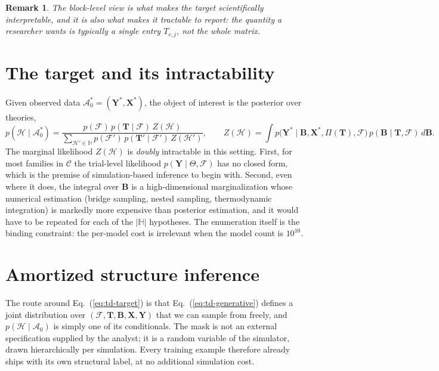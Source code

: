 \documentclass[11pt]{article}
\newcommand{\rmB}{\mathbf{B}}
\newcommand{\rmX}{\mathbf{X}}
\newcommand{\rmY}{\mathbf{Y}}
\newcommand{\rmT}{\mathbf{T}}
\providecommand{\cref}[1]{Eq.~(\ref{#1})}
\newtheorem{remark}{Remark}
\begin{document}
\begin{remark}
The block-level view is what makes the target scientifically interpretable, and it is
also what makes it tractable to report: the quantity a researcher wants is typically a
single entry $T_{c,j}$, not the whole matrix.
\end{remark}

\section{The target and its intractability}

Given observed data $\mathcal{A}_0^\ast = (\rmY^\ast, \rmX^\ast)$, the object of interest is
the posterior over theories,
%
\begin{equation}
\label{eq:td-target}
p(\mathcal{H} \mid \mathcal{A}_0^\ast)
= \frac{p(\mathcal{F})\,p(\rmT \mid \mathcal{F})\, Z(\mathcal{H})}
       {\sum_{\mathcal{H}' \in \mathbb{H}} p(\mathcal{F}')\,p(\rmT' \mid \mathcal{F}')\, Z(\mathcal{H}')},
\qquad
Z(\mathcal{H}) = \!\int\! p\big(\rmY^\ast \mid \rmB, \rmX^\ast, \Pi(\rmT), \mathcal{F}\big)\,
p(\rmB \mid \rmT, \mathcal{F})\, d\rmB .
\end{equation}
%
The marginal likelihood $Z(\mathcal{H})$ is \emph{doubly} intractable in this setting.
First, for most families in $\mathcal{C}$ the trial-level likelihood
$p(\rmY \mid \Theta, \mathcal{F})$ has no closed form, which is the premise of
simulation-based inference to begin with. Second, even where it does, the integral over
$\rmB$ is a high-dimensional marginalization whose numerical estimation (bridge
sampling, nested sampling, thermodynamic integration) is markedly more expensive than
posterior estimation, and it would have to be repeated for each of the $|\mathbb{H}|$
hypotheses. The enumeration itself is the binding constraint: the per-model cost is
irrelevant when the model count is $10^{10}$.

\section{Amortized structure inference}

The route around \cref{eq:td-target} is that \cref{eq:td-generative} defines a joint
distribution over $(\mathcal{F}, \rmT, \rmB, \rmX, \rmY)$ that we can sample from
freely, and $p(\mathcal{H} \mid \mathcal{A}_0)$ is simply one of its conditionals. The
mask is not an external specification supplied by the analyst; it is a random variable
of the simulator, drawn hierarchically per simulation. Every training example therefore
already ships with its own structural label, at no additional simulation cost.
\end{document}
